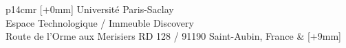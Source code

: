 \vspace{3cm} %
\selectfont
\begin{tabular}{p{14cm}r}
[+0mm]{{\color{Prune} Université Paris-Saclay\\
Espace Technologique / Immeuble Discovery\\
Route de l’Orme aux Merisiers RD 128 / 91190 Saint-Aubin, France}} & [+9mm]\\
\end{tabular}
